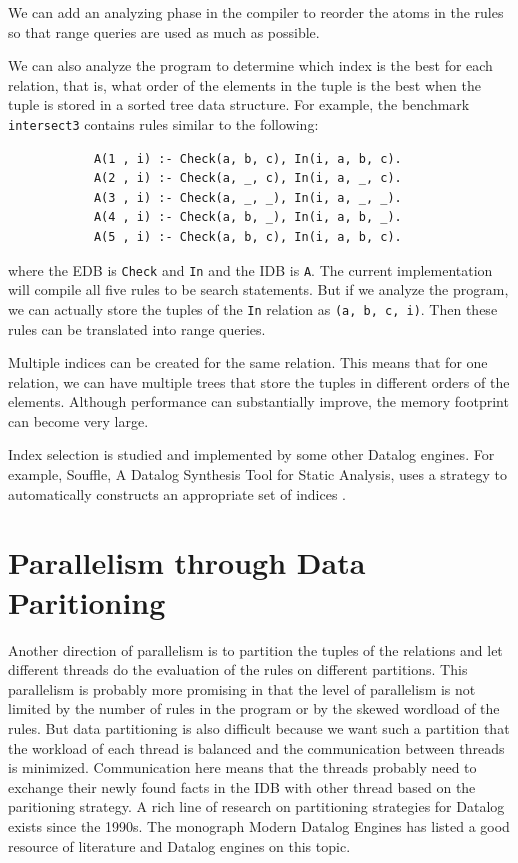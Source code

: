 \documentclass[11pt]{report}
\theoremstyle{definition}
\begin{document}
We can add an analyzing phase in the compiler to reorder the atoms in the rules so that range queries are used as much as possible.

We can also analyze the program to determine which index is the best for each relation, that is, what order of the elements in the tuple is the best when the tuple is stored in a sorted tree data structure. For example, the benchmark \texttt{intersect3} contains rules similar to the following:

\begin{verbatim}
            A(1 , i) :- Check(a, b, c), In(i, a, b, c).
            A(2 , i) :- Check(a, _, c), In(i, a, _, c).
            A(3 , i) :- Check(a, _, _), In(i, a, _, _).
            A(4 , i) :- Check(a, b, _), In(i, a, b, _).
            A(5 , i) :- Check(a, b, c), In(i, a, b, c).
\end{verbatim}

where the EDB is \texttt{Check} and \texttt{In} and the IDB is \texttt{A}. The current implementation will compile all five rules to be search statements. But if we analyze the program, we can actually store the tuples of the \texttt{In} relation as \texttt{(a, b, c, i)}. Then these rules can be translated into range queries.

Multiple indices can be created for the same relation. This means that for one relation, we can have multiple trees that store the tuples in different orders of the elements. Although performance can substantially improve, the memory footprint can become very large.

Index selection is studied and implemented by some other Datalog engines. For example, Souffle, A Datalog Synthesis Tool for Static Analysis, uses a strategy to automatically constructs an appropriate set of indices \cite{10.14778/3282495.3282500}.

\section{Parallelism through Data Paritioning}

Another direction of parallelism is to partition the tuples of the relations and let different threads do the evaluation of the rules on different partitions. This parallelism is probably more promising in that the level of parallelism is not limited by the number of rules in the program or by the skewed wordload of the rules. But data partitioning is also difficult because we want such a partition that the workload of each thread is balanced and the communication between threads is minimized. Communication here means that the threads probably need to exchange their newly found facts in the IDB with other thread based on the paritioning strategy. A rich line of research on partitioning strategies for Datalog exists since the 1990s. The monograph Modern Datalog Engines \cite{DBS-073} has listed a good resource of literature and Datalog engines on this topic.
\end{document}
